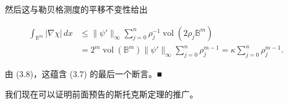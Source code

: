 \begin{lemma}
然后这与勒贝格测度的平移不变性给出

\begin{equation*}
\begin{aligned}
\int_{\mathbb{R}^m}|\nabla\chi|\,dx &\le \|\psi'\|_\infty \sum_{j=0}^{n}\rho_j^{-1}\operatorname{vol}(2\rho_j\mathbb{B}^m) \\ &= 2^m\operatorname{vol}(\mathbb{B}^m)\|\psi'\|_\infty \sum_{j=0}^{n}\rho_j^{m-1} = \kappa \sum_{j=0}^{n}\rho_j^{m-1} .
\end{aligned}
\end{equation*}

由 (3.8)，这蕴含 (3.7) 的最后一个断言。\nobreak\hspace{0.35em}■

\end{lemma}

我们现在可以证明前面预告的斯托克斯定理的推广。

